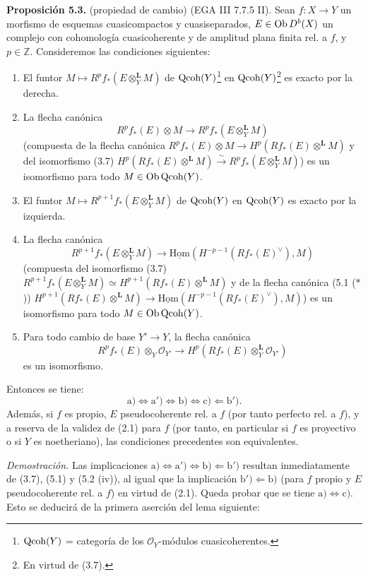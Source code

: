 \textbf{Proposición 5.3.} (propiedad de cambio) (EGA III 7.7.5 II). Sean \(f:X\to Y\) un morfismo de esquemas cuasicompactos y cuasiseparados, \(E\in\operatorname{Ob} D^b(X)\) un complejo con cohomología cuasicoherente y de amplitud plana finita rel. a \(f\), y \(p\in\mathbb Z\). Consideremos las condiciones siguientes:
\begin{enumerate}[label=\alph*)]
\item[a)] El funtor \(M\mapsto R^pf_*(E\otimes_Y^{\mathbf L}M)\) de \(\operatorname{Qcoh}(Y)\)\footnote{\(\operatorname{Qcoh}(Y)\) = categoría de los \(\mathcal O_Y\)-módulos cuasicoherentes.} en \(\operatorname{Qcoh}(Y)\)\footnote{En virtud de (3.7).} es exacto por la derecha.
\item[a')] La flecha canónica
\[
 R^pf_*(E)\otimes M\longrightarrow R^pf_*(E\otimes_Y^{\mathbf L}M)
\]
(compuesta de la flecha canónica \(R^pf_*(E)\otimes M\longrightarrow H^p(Rf_*(E)\otimes^{\mathbf L}M)\) y del isomorfismo (3.7) \(H^p(Rf_*(E)\otimes^{\mathbf L}M)\xrightarrow{\sim}R^pf_*(E\otimes_Y^{\mathbf L}M)\)) es un isomorfismo para todo \(M\in\operatorname{Ob}\operatorname{Qcoh}(Y)\).
\item[b)] El funtor \(M\mapsto R^{p+1}f_*(E\otimes_Y^{\mathbf L}M)\) de \(\operatorname{Qcoh}(Y)\) en \(\operatorname{Qcoh}(Y)\) es exacto por la izquierda.
\item[b')] La flecha canónica
\[
 R^{p+1}f_*(E\otimes_Y^{\mathbf L}M)\longrightarrow\underline{\mathrm{Hom}}(H^{-p-1}(Rf_*(E)^{\vee}),M)
\]
(compuesta del isomorfismo (3.7) \(R^{p+1}f_*(E\otimes_Y^{\mathbf L}M)\simeq H^{p+1}(Rf_*(E)\otimes^{\mathbf L}M)\) y de la flecha canónica (5.1 (\(*\))) \(H^{p+1}(Rf_*(E)\otimes^{\mathbf L}M)\longrightarrow\underline{\mathrm{Hom}}(H^{-p-1}(Rf_*(E)^{\vee}),M)\)) es un isomorfismo para todo \(M\in\operatorname{Ob}\operatorname{Qcoh}(Y)\).
\item[c)] Para todo cambio de base \(Y'\to Y\), la flecha canónica
\[
 R^pf_*(E)\otimes_Y\mathcal O_{Y'}\longrightarrow H^p(Rf_*(E)\otimes_Y^{\mathbf L}\mathcal O_{Y'})
\]
es un isomorfismo.
\end{enumerate}
Entonces se tiene:
\[
 \mathrm a)\Longleftrightarrow\mathrm a')\Longleftrightarrow\mathrm b)\Longleftrightarrow\mathrm c)\Longleftarrow\mathrm b').
\]
Además, si \(f\) es propio, \(E\) pseudocoherente rel. a \(f\) (por tanto perfecto rel. a \(f\)), y a reserva de la validez de (2.1) para \(f\) (por tanto, en particular si \(f\) es proyectivo o si \(Y\) es noetheriano), las condiciones precedentes son equivalentes.

\emph{Demostración.} Las implicaciones \(\mathrm a)\Longleftrightarrow\mathrm a')\Longleftrightarrow\mathrm b)\Longleftarrow\mathrm b')\) resultan inmediatamente de (3.7), (5.1) y (5.2 (iv)), al igual que la implicación \(\mathrm b')\Longleftarrow\mathrm b)\) (para \(f\) propio y \(E\) pseudocoherente rel. a \(f\)) en virtud de (2.1). Queda probar que se tiene \(\mathrm a)\Longleftrightarrow\mathrm c)\). Esto se deducirá de la primera aserción del lema siguiente:

